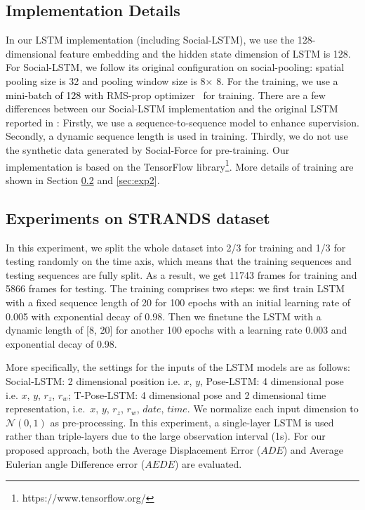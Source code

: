 \documentclass[letterpaper, 10 pt, conference]{ieeeconf}  %
\newcommand\kevinupdate[1]{\textcolor{black}{#1}}
\begin{document}
\subsection{Implementation Details}
In our LSTM implementation (including Social-LSTM), we use the 128-dimensional feature embedding and the hidden state dimension of LSTM is 128. For Social-LSTM, we follow its original configuration on social-pooling: spatial pooling size is 32 and pooling window size is 8$\times$ 8. For the training, we use \kevinupdate{a mini-batch of 128 with} RMS-prop optimizer~\cite{bengiormsprop} for training. There are a few differences between our Social-LSTM implementation and the original LSTM reported in \cite{social-lstm}: Firstly, we use a sequence-to-sequence model to enhance supervision. Secondly, a dynamic sequence length is used in training. Thirdly, we do not use the synthetic data generated by Social-Force \cite{helbing1995social} for pre-training. Our implementation is based on the TensorFlow library\footnote{https://www.tensorflow.org/}. More details of training are shown in Section \ref{sec:exp1} and \ref{sec:exp2}.

\subsection{Experiments on STRANDS dataset}\label{sec:exp1}
In this experiment, we split the whole dataset into 2/3 for training and 1/3 for testing randomly on the time axis, which means that the training sequences and testing sequences are fully split. As a result, we get 11743 frames for training and 5866 frames for testing. The training comprises two steps: we first train LSTM with a fixed sequence length of 20 for 100 epochs with an initial learning rate of 0.005 with exponential decay of 0.98. Then we finetune the LSTM with a dynamic length of [8, 20] for another 100 epochs with a learning rate 0.003 and exponential decay of 0.98. 


More specifically, the settings for the inputs of the LSTM models are as follows: Social-LSTM: 2 dimensional position i.e. $x$, $y$,  Pose-LSTM: 4 dimensional pose i.e. $x$, $y$, $r_z$, $r_w$; T-Pose-LSTM: 4 dimensional pose and 2 dimensional time representation, i.e.\ $x$, $y$, $r_z$, $r_w$, $date$, $time$. We normalize each input dimension to $\mathcal{N}(0, 1)$ as pre-processing. In this experiment, a single-layer LSTM is used rather than triple-layers due to the large observation interval (1s). For our proposed approach, both the Average Displacement Error ($ADE$) and Average Eulerian angle Difference error ($AEDE$) are evaluated. 
  
\end{document}
